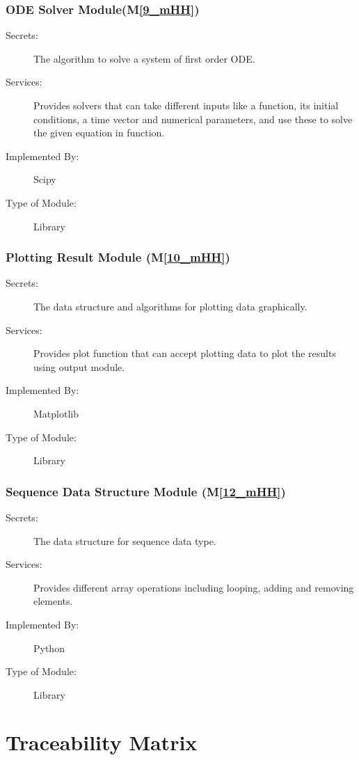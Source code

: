 \documentclass[12pt, titlepage]{article}
\newcommand{\mref}[1]{M\ref{#1}}
\begin{document}
\subsubsection{ODE Solver Module(\mref{9_mHH})}

\begin{description}
\item[Secrets:]The algorithm to solve a system of first order ODE. 
\item[Services:] Provides solvers that can take different inputs like a function, its initial conditions, a time vector and numerical parameters, and use these to solve the given equation in function.  
\item[Implemented By:] Scipy
\item[Type of Module:] Library
\end{description}

\subsubsection{Plotting Result Module (\mref{10_mHH})}

\begin{description}
\item[Secrets:] The data structure and algorithms for plotting data graphically. 
\item[Services:] Provides plot function that can accept plotting data to plot the results using output module. 
\item[Implemented By:] Matplotlib
\item[Type of Module:] Library
\end{description}

\subsubsection{Sequence Data Structure Module (\mref{12_mHH})}

\begin{description}
\item[Secrets:] The data structure for sequence data type. 
\item[Services:] Provides different array operations including looping, adding and removing elements. 
\item[Implemented By:] Python
\item[Type of Module:] Library
\end{description}


\section{Traceability Matrix} \label{SecTM}
\end{document}
